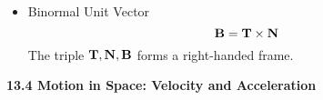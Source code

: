 \begin{itemize}
    
      
    
    



  
    \item Binormal Unit Vector
      \[\mathbf{B} = \mathbf{T} \times \mathbf{N}\]
      The triple $\mathbf{T},\mathbf{N},\mathbf{B}$ forms a right-handed frame.

  \end{itemize}

\newpage

\centerline{\bf 13.4 Motion in Space: Velocity and Acceleration}


